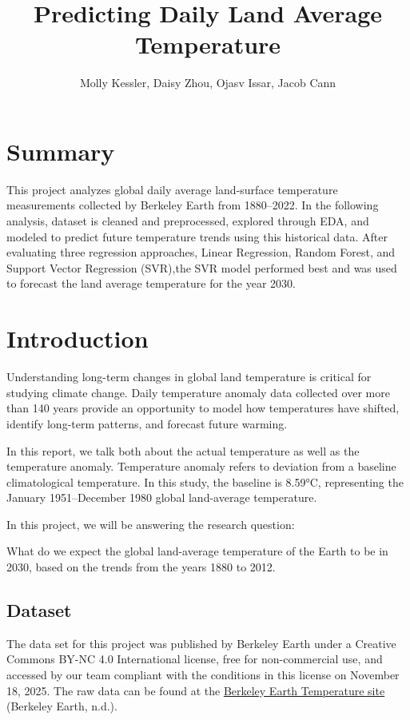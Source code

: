 \documentclass[
  letterpaper,
  DIV=11,
  numbers=noendperiod]{scrartcl}
\title{Predicting Daily Land Average Temperature}
\author{Molly Kessler, Daisy Zhou, Ojasv Issar, Jacob Cann}
\date{}
\renewcommand*\contentsname{Table of contents}
\newcommand\contentsname{Table of contents}
\begin{document}
\maketitle

\renewcommand*\contentsname{Table of contents}
{
\hypersetup{linkcolor=}
\setcounter{tocdepth}{3}
\tableofcontents
}

\section{Summary}\label{summary}

This project analyzes global daily average land-surface temperature
measurements collected by Berkeley Earth from 1880--2022. In the
following analysis, dataset is cleaned and preprocessed, explored
through EDA, and modeled to predict future temperature trends using this
historical data. After evaluating three regression approaches, Linear
Regression, Random Forest, and Support Vector Regression (SVR),the SVR
model performed best and was used to forecast the land average
temperature for the year 2030.

\section{Introduction}\label{introduction}

Understanding long-term changes in global land temperature is critical
for studying climate change. Daily temperature anomaly data collected
over more than 140 years provide an opportunity to model how
temperatures have shifted, identify long-term patterns, and forecast
future warming.

In this report, we talk both about the actual temperature as well as the
temperature anomaly. Temperature anomaly refers to deviation from a
baseline climatological temperature. In this study, the baseline is
8.59°C, representing the January 1951--December 1980 global land-average
temperature.

In this project, we will be answering the research question:

What do we expect the global land-average temperature of the Earth to be
in 2030, based on the trends from the years 1880 to 2012.

\subsection{Dataset}\label{dataset}

The data set for this project was published by Berkeley Earth under a
Creative Commons BY-NC 4.0 International license, free for
non-commercial use, and accessed by our team compliant with the
conditions in this license on November 18, 2025. The raw data can be
found at the
\href{https://berkeley-earth-temperature.s3.us-west-1.amazonaws.com/Global/Complete_TAVG_daily.txt}{Berkeley
Earth Temperature site} (Berkeley Earth, n.d.).
\end{document}
